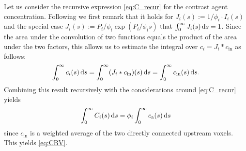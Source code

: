 \documentclass[journal,twocolumn]{IEEEtran}
\newcommand{\ca}{c_\mathrm{a}}
\begin{document}
	Let us consider the recursive expression \eqref{eq:C_recur} for the contrast agent concentration.
	Following \cite{sourbron13} we first remark that it holds for $J_i(s):= 1/\phi_i\cdot I_i(s)$ and the special case $J_i(s):=P_i/\phi_i\exp(P_i/\phi_i s)$ that $\int_{0}^\infty J_i(s) \,\mathrm{d} s = 1$.
	Since the area under the convolution of two functions equals the product of the area under the two factors, this allows us to estimate the integral over $c_i = J_i*c_{\mathrm{in}}$ as follows:
	\begin{equation}
		\int_0^\infty c_i(s) \,\mathrm{d} s = \int_{0}^\infty (J_i*c_{\mathrm{in}})(s) \,\mathrm{d} s = \int_{0} ^ \infty c_\mathrm{in}(s)  \,\mathrm{d} s.
	\end{equation}
	Combining this result recursively with the considerations around \eqref{eq:C_recur} yields
	\begin{equation}
		\int_0^\infty C_i(s)\diffint s = \phi_i \int_0^\infty \ca(s) \diffint s
	\end{equation}
	since $c_\mathrm{in}$ is a weighted average of the two directly connected upstream voxels.
	This yields \eqref{eq:CBV}.
	
\end{document}
